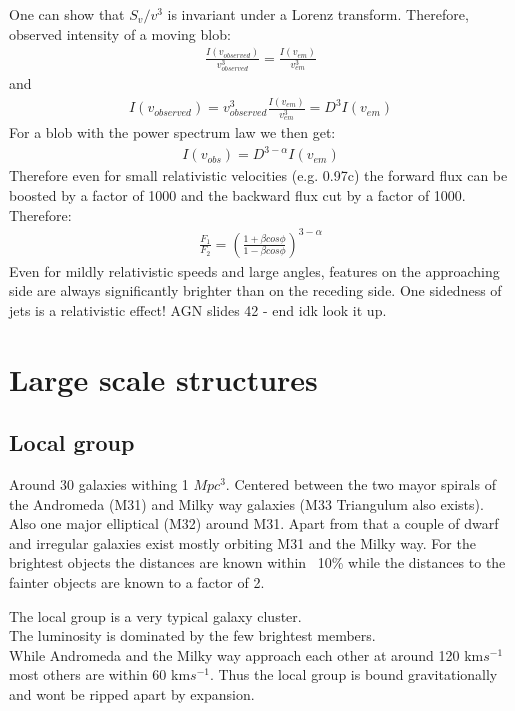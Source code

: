 \documentclass[11pt,a4paper]{article}
\begin{document}
One can show that $S_v / v^3$ is invariant under a Lorenz transform.
Therefore, observed intensity of a moving blob: 
\begin{align*}
    \frac {I (v_{observed})} {v^3_{observed}} = \frac {I (v_{em})} {v^3_{em}}
\end{align*}
and 
\begin{align*}
    I (v_{observed}) = v^3_{observed} \frac {I(v_{em})} {v_{em}^3} = D^3 I (v_{em})
\end{align*}
For a blob with the power spectrum law we then get:
\begin{align*}
    I(v_{obs}) = D^{3-\alpha} I(v_{em})
\end{align*}
Therefore even for small relativistic velocities (e.g. 0.97c) the forward flux can be boosted by a factor of 1000 and the backward flux cut by a factor of 1000.
Therefore: 
\begin{align*}
    \frac {F_1}{F_2} = (\frac {1+\beta cos \phi}{1-\beta cos \phi})^{3-\alpha}
\end{align*}
Even for mildly relativistic speeds and large
angles, features on the approaching side are
always significantly brighter than on the receding side.
One sidedness of jets is a relativistic effect!
AGN slides 42 - end idk look it up.
\section{Large scale structures}
\subsection{Local group}
Around 30 galaxies withing 1 $Mpc^3$.
Centered between the two mayor spirals of the Andromeda (M31) and Milky way galaxies (M33 Triangulum also exists).
Also one major elliptical (M32) around M31.
Apart from that a couple of dwarf and irregular galaxies exist mostly orbiting M31 and the Milky way.
For the brightest objects the distances are known within ~10\% while the distances to the fainter objects are known to a factor of 2. 

The local group is a very typical galaxy cluster. \\ 
The luminosity is dominated by the few brightest members. \\ 
While Andromeda and the Milky way approach each other at around 120 km$s^{-1}$ most others are within 60 km$s^{-1}$. 
Thus the local group is bound gravitationally and wont be ripped apart by expansion.
\end{document}
